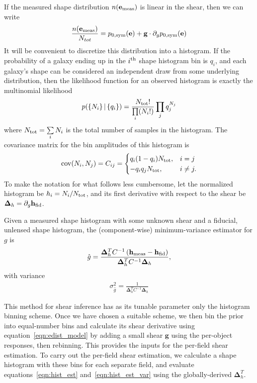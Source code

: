 \documentclass[iop]{emulateapj}
\begin{document}
If the measured shape distribution $n(\mathbf{e}_{\rm meas})$ is linear
in the shear, then we can write
\begin{align}
\frac{n(\mathbf{e}_{\rm meas})}{N_{tot}} = p_{0,\rm sym}(\mathbf{e}) + \mathbf{g}\cdot \partial_{g} p_{0,\rm sym}(\mathbf{e})
\end{align}
It will be convenient to discretize this distribution into a
histogram. If the probability of a galaxy ending up in the
$i^{\rm th}$ shape histogram bin is $q_i$, and each galaxy's shape can
be considered an independent draw from some underlying distribution,
then the likelihood function for an observed histogram is exactly the
multinomial likelihood
\begin{align}
p( \left\{N_i\right\} |\left\{ q_i\right\} ) = \frac{N_{\rm tot}!}{\prod\limits_i (N_i!)}\prod\limits_j q_j^{N_j}
\label{eqn:multnomial}
\end{align}
where $N_{\rm tot} = \sum\limits_i N_i$ is the total number of samples
in the histogram. The covariance matrix for the
bin amplitudes of this histogram is
\begin{align}
{\rm cov}(N_i, N_j) = C_{ij} = \begin{cases}
  q_i(1-q_i)N_{\rm tot}, & i=j \\
  -q_iq_j N_{\rm tot}, & i \neq j.
\end{cases}
\end{align}
To make the notation for what follows less cumbersome, let the
normalized histogram be $h_i = N_i / N_{\rm tot}$, and its first
derivative with respect to the shear be
$\mathbf{\Delta}_h=\partial_{g}\mathbf{h}_{\rm fid}$.

Given a measured shape histogram with some unknown shear and a
fiducial, unlensed shape histogram, the (component-wise)
minimum-variance estimator for $g$ is
\begin{align}
\hat{g} = \frac{\mathbf{\Delta}_h^T C^{-1}\left( \mathbf{h}_{\rm meas} - \mathbf{h}_{\rm fid}\right)} {\mathbf{\Delta}_h^TC^{-1}\mathbf{\Delta}_h},
\label{eqn:hist_est}
\end{align}
with variance 
\begin{align}
\sigma^2_{\hat{g}} = \frac{1}{\mathbf{\Delta}_h^TC^{-1}\mathbf{\Delta}_h}
\label{eqn:hist_est_var}
\end{align}

This method for shear inference has as its tunable parameter only the
histogram binning scheme. Once we have chosen a suitable scheme, we
then bin the prior into equal-number bins and calculate its shear
derivative using equation~\ref{eqn:edist_model} by adding a small
shear $\mathbf{g}$ using the per-object responses, then
rebinning. This provides the inputs for the per-field shear
estimation.  To carry out the per-field shear estimation, we calculate
a shape histogram with these bins for each separate field, and
evaluate equations~\ref{eqn:hist_est} and~\ref{eqn:hist_est_var} using
the globally-derived $\mathbf{\Delta}_h^T$.
\end{document}
